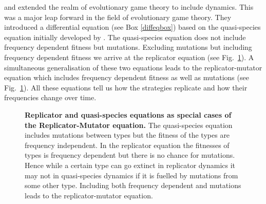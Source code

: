 \documentclass[oneside,11pt,a4paper]{book}
\begin{document}
\citet{taylor:1978wv} and \citet{zeeman:1980ze} extended the realm of evolutionary game theory to include dynamics.
This was a major leap forward in the field of evolutionary game theory.
They introduced a differential equation (see Box \ref{diffeqbox}) based on the quasi-species equation initially developed by \citet{eigen:1977aa} \citep{eigen:1989aa}.
The quasi-species equation does not include frequency dependent fitness but mutations.
Excluding mutations but including frequency dependent fitness we arrive at the replicator equation (see Fig.\ \ref{fig:equations}).
A simultaneous generalisation of these two equations leads to the replicator-mutator equation  which includes frequency dependent fitness as well as mutations \citep{stadler:1992wv,bomze:1995rm,nowak:2001ln,page:2002an} (see Fig.\ \ref{fig:equations}).
All these equations tell us how the strategies replicate and how their frequencies change over time.
%
\begin{figure}[h]
  \begin{center}
  \end{center}
  \caption{
  \label{fig:equations}
  \textbf{Replicator and quasi-species equations as special cases of the Replicator-Mutator equation.}
  \small{The quasi-species equation includes mutations between types but the fitness of the types are frequency independent.
  In the replicator equation the fitnesses  of types is frequency dependent but there is no chance for mutations.
  Hence while a certain type can go extinct in replicator dynamics it may not in quasi-species dynamics if it is fuelled by mutations from some other type.
  Including both frequency dependent and mutations leads to the replicator-mutator equation.}
  }
\end{figure}
%
\newpage
\end{document}
